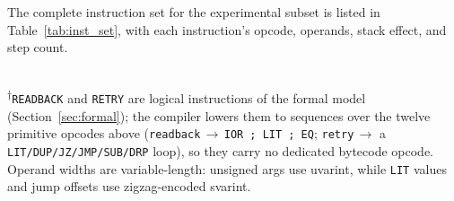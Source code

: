\documentclass[a4paper,fleqn,longmktitle]{cas-dc}
\begin{document}
The complete instruction set for the experimental subset is listed in Table~\ref{tab:inst_set}, with each instruction's opcode, operands, stack effect, and step count.

\begin{table}[t]
\centering
\caption{Compact bytecode instruction set (14-instruction formalized subset).}
\label{tab:inst_set}
\footnotesize
{}\\[2pt]
{\footnotesize \textsuperscript{$\dagger$}\texttt{READBACK} and \texttt{RETRY} are logical instructions of the formal model (Section~\ref{sec:formal}); the compiler lowers them to sequences over the twelve primitive opcodes above (\texttt{readback}\,$\to$\,\texttt{IOR\,;\,LIT\,;\,EQ}; \texttt{retry}\,$\to$ a \texttt{LIT/DUP/JZ/JMP/SUB/DRP} loop), so they carry no dedicated bytecode opcode. Operand widths are variable-length: unsigned args use uvarint, while \texttt{LIT} values and jump offsets use zigzag-encoded svarint.}
\end{table}
\end{document}

